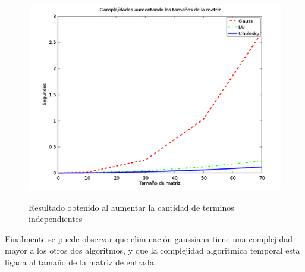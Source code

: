 \begin{figure}[H]
   \includegraphics[scale=0.8]{complejidadesCorrecto.png}
   \label{Fig. 7}
   \caption{Resultado obtenido al aumentar la cantidad de terminos independientes}
\end{figure}


Finalmente se puede observar que eliminación gaussiana tiene una complejidad mayor a los otros dos algoritmos, y que la complejidad algoritmica temporal esta ligada al tamaño de la matriz de entrada.